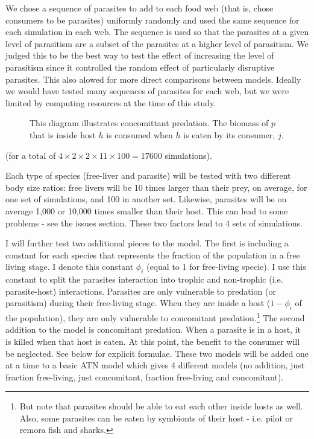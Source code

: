 \documentclass[11pt]{amsart}
\begin{document}
We chose a sequence of parasites to add to each food web (that is, chose consumers to be parasites) uniformly randomly and used the same sequence for each simulation in each web.  The sequence is used so that the parasites at a given level of parasitism are a subset of the parasites at a higher level of parasitism.  We judged this to be the best way to test the effect of increasing the level of parasitism since it controlled the random effect of particularly disruptive parasites.  This also alowed for more direct comparisons between models.  Ideally we would have tested many sequences of parasites for each web, but we were limited by computing resources at the time of this study.  




\begin{figure}
\caption{This diagram illustrates concomittant predation.  The biomass of $p$ that is inside host $h$ is consumed when $h$ is eaten by its consumer, $j$. \label{fig:concDiagram}}
\end{figure}

(for a total of $4\times2\times2\times 11\times 100 = 17600$ simulations).  


Each type of species (free-liver and parasite) will be tested with two different body size ratios: free livers will be 10 times larger than their prey, on average, for one set of simulations, and 100 in another set.  Likewise, parasites will be on average 1,000 or 10,000 times smaller than their host.  This can lead to some problems - see the issues section.  These two factors lead to 4 sets of simulations.

I will further test two additional pieces to the model.  The first is including a constant for each species that represents the fraction of the population in a free living stage.  I denote this constant $\phi_{i}$ (equal to 1 for free-living specie).  I use this constant to split the parasites interaction into trophic and non-trophic (i.e. parasite-host) interactions.  Parasites are only vulnerable to predation (or parasitism) during their free-living stage.  When they are inside a host ($1-\phi_{i}$ of the population), they are only vulnerable to concomitant predation.\footnote{But note that parasites should be able to eat each other inside hosts as well.  Also, some parasites can be eaten by symbionts of their host - i.e. pilot or remora fish and sharks.}  The second addition to the model is concomitant predation.  When a parasite is in a host, it is killed when that host is eaten.  At this point, the benefit to the consumer will be neglected.  See below for explicit formulae.  These two models will be added one at a time to a basic ATN model which gives 4 different models (no addition, just fraction free-living, just concomitant, fraction free-living and concomitant).
\end{document}
